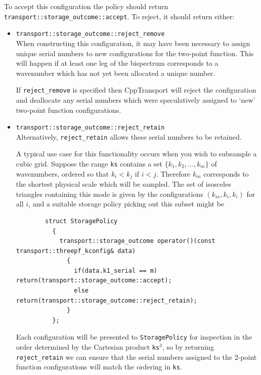 \documentclass[11pt,a4paper]{article}
\newcommand{\packagefont}{\sffamily}
\newcommand{\CppTransport}{{\packagefont CppTransport}}
\begin{document}
To accept this configuration the policy should return
\texttt{transport::storage_outcome::accept}.
To reject, it should return either:
\begin{itemize}
    \item \texttt{transport::storage_outcome::reject_remove} \\
    When constructing this configuration, it may have been necessary to assign
    unique serial numbers to new configurations for the two-point function.
    This will happen if at least one leg of the bispectrum corresponds to a wavenumber
    which has not yet been allocated a unique number.
    
    If \texttt{reject_remove} is specified then {\CppTransport} will
    reject the configuration and deallocate any serial numbers which were speculatively
    assigned to `new' two-point function configurations.
    
    \item \texttt{transport::storage_outcome::reject_retain} \\
    Alternatively, \texttt{reject_retain} allows these serial numbers to be
    retained.
    
    A typical use case for this functionality occurs when you wish to
    subsample a cubic grid.
    Suppose the range \texttt{ks} contains a set
    $\{ k_1, k_2, \ldots, k_m \}$ of wavenumbers, ordered so that
    $k_i < k_j$ if $i < j$.
    Therefore $k_m$ corresponds to the shortest physical scale which will be sampled.
    The set of isosceles triangles containing this mode
    is given by the configurations
    $(k_m, k_i, k_i)$ for all $i$, and a suitable storage policy picking out
    this subset might be
    \begin{verbatim}
        struct StoragePolicy
          {
            transport::storage_outcome operator()(const transport::threepf_kconfig& data)
              {
                if(data.k1_serial == m) return(transport::storage_outcome::accept);
                else                    return(transport::storage_outcome::reject_retain);
              }
          };
    \end{verbatim}
    Each configuration will be presented to
    \texttt{StoragePolicy} for inspection in the order
    determined by the Cartesian product \texttt{ks}$^3$,
    so by returning
    \texttt{reject_retain} we can ensure that the
    serial numbers assigned to the 2-point function configurations
    will match the ordering in \texttt{ks}.
\end{itemize}
\end{document}
